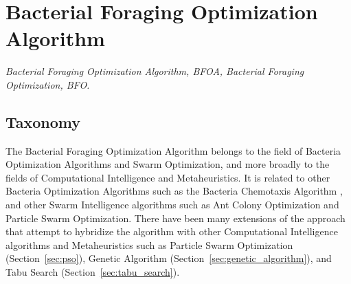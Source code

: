 

\section{Bacterial Foraging Optimization Algorithm} 
\label{sec:bfoa}

\emph{Bacterial Foraging Optimization Algorithm, BFOA, Bacterial Foraging Optimization, BFO.}

\subsection{Taxonomy}
The Bacterial Foraging Optimization Algorithm belongs to the field of Bacteria Optimization Algorithms and Swarm Optimization, and more broadly to the fields of Computational Intelligence and Metaheuristics.
It is related to other Bacteria Optimization Algorithms such as the Bacteria Chemotaxis Algorithm \cite{Muller2002}, and other Swarm Intelligence algorithms such as Ant Colony Optimization and Particle Swarm Optimization.
There have been many extensions of the approach that attempt to hybridize the algorithm with other Computational Intelligence algorithms and Metaheuristics such as Particle Swarm Optimization (Section~\ref{sec:pso}), Genetic Algorithm (Section~\ref{sec:genetic_algorithm}), and Tabu Search (Section~\ref{sec:tabu_search}).

